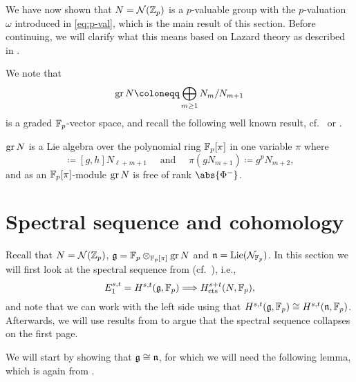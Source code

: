 We have now shown that $N = \mathcal{N}(\mathbb{Z}_{p})$ is a $p$-valuable group with the $p$-valuation $\omega$ introduced in \eqref{eq:p-val}, which is the main result of this section. Before continuing, we will clarify what this means based on Lazard theory as described in .

We note that
\begin{equation*}
  \gr N \coloneqq \bigoplus_{m\geq1} N_{m}/N_{m+1}
\end{equation*}
is a graded $\mathbb{F}_{p}$-vector space, and recall the following well known result, cf.\ \cite{Laz} or \cite[Sect.~25]{Sch}.

\begin{proposition}
  $\operatorname{gr} N$ is a Lie algebra over the polynomial ring $\mathbb{F}_{p}[\pi]$ in one variable $\pi$ where
  \begin{equation*}
    [gN_{\ell+1},hN_{m+1}] \coloneqq [g,h]N_{\ell+m+1} \quad \text{ and } \quad \pi(gN_{m+1}) \coloneqq g^{p}N_{m+2},
  \end{equation*}
  and as an $\mathbb{F}_{p}[\pi]$-module $\operatorname{gr} N$ is free of rank $\abs{\Phi^{-}}$.
\end{proposition}


\section[Spectral sequence]{Spectral sequence and cohomology}\label{sec:specsec}

Recall that $N = \mathcal{N}(\mathbb{Z}_{p})$, $\mathfrak{g} = \mathbb{F}_p \otimes_{\mathbb{F}_p[\pi]} \operatorname{gr} N$ and $\mathfrak{n} = \operatorname{Lie}(\mathcal{N}_{\mathbb{F}_{p}})$. In this section we will first look at the spectral sequence from \cite{Sor} (cf.\ ), i.e.,
\begin{equation*}
  E_{1}^{s,t} = H^{s,t}(\mathfrak{g}, \mathbb{F}_{p}) \Longrightarrow H_{\mathrm{cts}}^{s+t}(N,\mathbb{F}_{p}),
\end{equation*}
and note that we can work with the left side using that $H^{s,t}(\mathfrak{g},\mathbb{F}_{p}) \cong H^{s,t}(\mathfrak{n},\mathbb{F}_{p})$. %
Afterwards, we will use results from \cite{PT} to argue that the spectral sequence collapses on the first page.

We will start by showing that $\mathfrak{g} \cong \mathfrak{n}$, for which we will need the following lemma, which is again from \cite{Sch-notes}.

